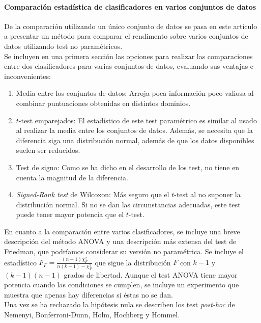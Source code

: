 \paragraph{Comparación estadística de clasificadores en 
varios conjuntos de datos} \cite{DEMSAR06} De la comparación 
utilizando un único conjunto de datos se pasa en este 
artículo a presentar un método para comparar el rendimento 
sobre varios conjuntos de datos utilizando test no 
paramétricos.\\
	Se incluyen en una primera sección las opciones para 
realizar las comparaciones entre dos clasificadores para 
varias conjuntos de datos, evaluando sus ventajas e 
inconvenientes:
	\begin{enumerate}
	\item Media entre los conjuntos de datos: Arroja poca 
		información poco valiosa al combinar puntuaciones 
		obtenidas en distintos dominios.
	\item $t$-test emparejados: El estadístico de este test 
		paramétrico es similar al usado al realizar la media 
		entre los conjuntos de datos. Además, se necesita que 
		la diferencia siga una distribución normal, además de 
		que los datos disponibles suelen ser reducidos. 
	\item Test de signo: Como se ha dicho en el desarrollo de 
		los test, no tiene en cuenta la magnitud de la 
		diferencia.
	\item \textit{Signed-Rank test} de Wilcoxon: Más seguro 
		que el $t$-test al no suponer la distribución normal. 
		Si no se dan las circunstancias adecuadas, este test 
		puede tener mayor potencia que el $t$-test.
	\end{enumerate}
	
	En cuanto a la comparación entre varios clasificadores, 
se incluye una breve descripción del método ANOVA y una 
descripción más extensa del test de Friedman, que podríamos 
considerar su versión no paramétrica. Se incluye el 
estadístico $F_F = \frac{(n-1) \chi^2_F}{n(k-1) - \chi^2_F}$ 
que sigue la distribución $F$ con $k-1$ y $(k-1)(n-1)$ grados 
de libertad. Aunque el test ANOVA tiene mayor potencia cuando 
las condiciones se cumplen, se incluye un experimento que 
muestra que apenas hay diferencias si éstas no se dan.\\

	Una vez se ha rechazado la hipótesis nula se describen 
los test \textit{post-hoc} de Nemenyi, Bonferroni-Dunn, Holm, 
Hochberg y Hommel.
	
	
